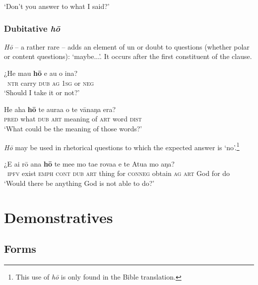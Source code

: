 \glt 
‘Don’t you answer to what I said?’ \textstyleExampleref{[R315.264]} 
\z
{}

\subsubsection[Dubitative hō]{Dubitative \textit{hō}}\label{sec:4.5.4.6}

\textit{Hō} – a rather rare  – adds an element of un or doubt to questions (whether polar or content questions): ‘maybe...’. It occurs after the first constituent of the clause.

\ea\label{ex:4.189}
\gll ¿He ma{\ꞌ}u \textbf{hō} e au {\ꞌ}o {\ꞌ}ina? \\
~\textsc{ntr} carry \textsc{dub} \textsc{ag} \textsc{1sg} or \textsc{neg} \\

\glt 
‘Should I take it or not?’ \textstyleExampleref{[R460.002]} 
\z

\ea\label{ex:4.190}
\gll He aha \textbf{hō} te aura{\ꞌ}a o te vānaŋa era?\\
\textsc{pred} what \textsc{dub} \textsc{art} meaning of \textsc{art} word \textsc{dist}\\

\glt
‘What could be the meaning of those words?’ \textstyleExampleref{[Luke 1:29]}
\z

\textit{Hō} may be used in rhetorical questions to which the expected answer is ‘no’.\footnote{\label{fn:208}This use of \textit{hō} is only found in the Bible translation.} 

\ea\label{ex:4.191}
\gll ¿E ai rō {\ꞌ}ana \textbf{hō} te me{\ꞌ}e mo ta{\ꞌ}e rova{\ꞌ}a e te {\ꞌ}Atua mo aŋa? \\
~\textsc{ipfv} exist \textsc{emph} \textsc{cont} \textsc{dub} \textsc{art} thing for \textsc{conneg} obtain \textsc{ag} \textsc{art} God for do \\

\glt 
‘Would there be anything God is not able to do?’ \textstyleExampleref{[Gen. 18:14]}
\z
{}
\section{Demonstratives}\label{sec:4.6}
\subsection{Forms}\label{sec:4.6.1}

